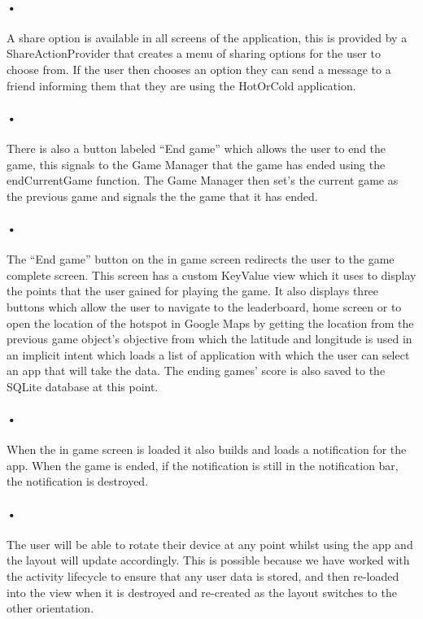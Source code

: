\documentclass[10pt, a4paper]{article}
\begin{document}
\paragraph*{•}
A share option is available in all screens of the application, this is provided by a ShareActionProvider that creates a menu of sharing options for the user to choose from. If the user then chooses an option they can send a message to a friend informing them that they are using the HotOrCold application.

\paragraph*{•}
There is also a button labeled ``End game'' which allows the user to end the game, this signals to the Game Manager that the game has ended using the endCurrentGame function. The Game Manager then set's the current game as the previous game and signals the the game that it has ended.

\paragraph*{•}
The ``End game'' button on the in game screen redirects the user to the game complete screen. This screen has a custom KeyValue view which it uses to display the points that the user gained for playing the game. It also displays three buttons which allow the user to navigate to the leaderboard, home screen or to open the location of the hotspot in Google Maps by getting the location from the previous game object's objective from which the latitude and longitude is used in an implicit intent which loads a list of application with which the user can select an app that will take the data. The ending games' score is also saved to the SQLite database at this point.

\paragraph*{•}
When the in game screen is loaded it also builds and loads a notification for the app. When the game is ended, if the notification is still in the notification bar, the notification is destroyed.

\paragraph*{•}
The user will be able to rotate their device at any point whilst using the app and the layout will update accordingly. This is possible because we have worked with the activity lifecycle to ensure that any user data is stored, and then re-loaded into the view when it is destroyed and re-created as the layout switches to the other orientation.
\end{document}

